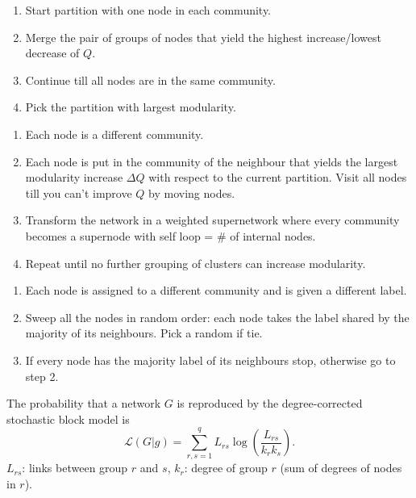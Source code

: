 \documentclass[a4paper,9pt]{extarticle}
\begin{document}
\begin{multicols*}{2}
		\begin{riquadro}
			\begin{enumerate}
				\item Start partition with one node in each community.
				\item Merge the pair of groups of nodes that yield the highest increase/lowest decrease of $Q$.
				\item Continue till all nodes are in the same community.
				\item Pick the partition with largest modularity.
			\end{enumerate}
		\end{riquadro}
		\begin{riquadro}
			\begin{enumerate}
				\item Each node is a different community.
				\item Each node is put in the community of the neighbour that yields the largest modularity increase $\Delta Q$ with respect to the current partition. Visit all nodes till you can't improve $Q$ by moving nodes.
				\item Transform the network in a weighted supernetwork where every community becomes a supernode with self loop = \# of internal nodes.
				\item Repeat until no further grouping of clusters can increase modularity.
			\end{enumerate}
		\end{riquadro}
		\begin{riquadro}
			\begin{enumerate}
				\item Each node is assigned to a different community and is given a different label.
				\item Sweep all the nodes in random order: each node takes the label shared by the majority of its neighbours. Pick a random if tie.
				\item If every node has the majority label of its neighbours stop, otherwise go to step 2.
			\end{enumerate}
		\end{riquadro}
		The probability that a network $G$ is reproduced by the degree-corrected stochastic block model is
		\begin{equation*}
			\mathcal{L}(G|g)=\sum_{r,s=1}^{q}L_{rs}\log\left(\frac{L_{rs}}{k_{r}k_{s}}\right).
		\end{equation*}
		$L_{rs}$: links between group $r$ and $s$, $k_{r}$: degree of group $r$ (sum of degrees of nodes in $r$).

\end{multicols*}
\end{document}
